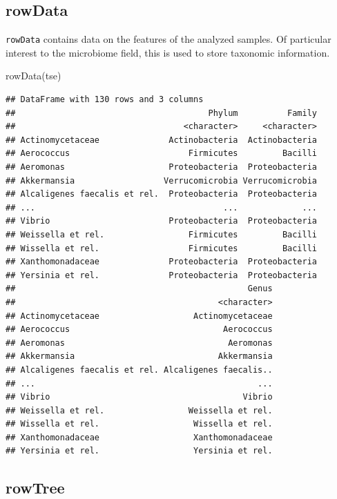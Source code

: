 \documentclass[
]{book}
\newenvironment{Shaded}{\begin{snugshade}}{\end{snugshade}}
\newcommand{\FunctionTok}[1]{\textcolor[rgb]{0.00,0.00,0.00}{#1}}
\newcommand{\NormalTok}[1]{#1}
\begin{document}
\hypertarget{rowdata}{%
\subsection{rowData}\label{rowdata}}

\texttt{rowData} contains data on the features of the analyzed samples. Of particular
interest to the microbiome field, this is used to store taxonomic information.

\begin{Shaded}
\begin{Highlighting}[]
\FunctionTok{rowData}\NormalTok{(tse)}
\end{Highlighting}
\end{Shaded}

\begin{verbatim}
## DataFrame with 130 rows and 3 columns
##                                       Phylum          Family
##                                  <character>     <character>
## Actinomycetaceae              Actinobacteria  Actinobacteria
## Aerococcus                        Firmicutes         Bacilli
## Aeromonas                     Proteobacteria  Proteobacteria
## Akkermansia                  Verrucomicrobia Verrucomicrobia
## Alcaligenes faecalis et rel.  Proteobacteria  Proteobacteria
## ...                                      ...             ...
## Vibrio                        Proteobacteria  Proteobacteria
## Weissella et rel.                 Firmicutes         Bacilli
## Wissella et rel.                  Firmicutes         Bacilli
## Xanthomonadaceae              Proteobacteria  Proteobacteria
## Yersinia et rel.              Proteobacteria  Proteobacteria
##                                               Genus
##                                         <character>
## Actinomycetaceae                   Actinomycetaceae
## Aerococcus                               Aerococcus
## Aeromonas                                 Aeromonas
## Akkermansia                             Akkermansia
## Alcaligenes faecalis et rel. Alcaligenes faecalis..
## ...                                             ...
## Vibrio                                       Vibrio
## Weissella et rel.                 Weissella et rel.
## Wissella et rel.                   Wissella et rel.
## Xanthomonadaceae                   Xanthomonadaceae
## Yersinia et rel.                   Yersinia et rel.
\end{verbatim}

\hypertarget{rowtree}{%
\subsection{rowTree}\label{rowtree}}
\end{document}

